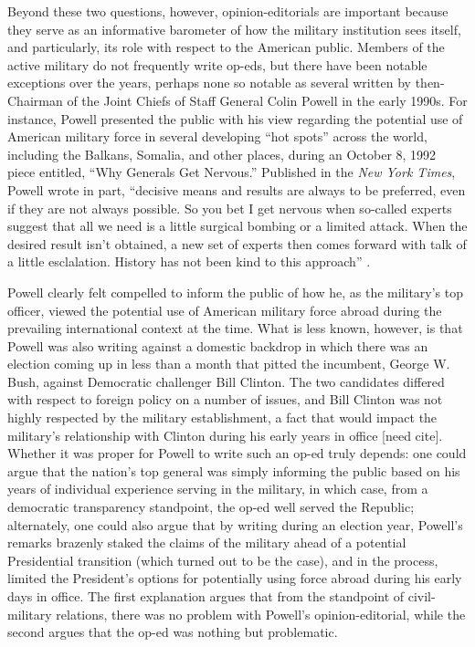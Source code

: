 \documentclass[12pt,]{article}
\begin{document}
Beyond these two questions, however, opinion-editorials are important because they serve as an informative barometer of how the military institution sees itself, and particularly, its role with respect to the American public. Members of the active military do not frequently write op-eds, but there have been notable exceptions over the years, perhaps none so notable as several written by then-Chairman of the Joint Chiefs of Staff General Colin Powell in the early 1990s. For instance, Powell presented the public with his view regarding the potential use of American military force in several developing ``hot spots'' across the world, including the Balkans, Somalia, and other places, during an October 8, 1992 piece entitled, ``Why Generals Get Nervous.'' Published in the \emph{New York Times}, Powell wrote in part, ``decisive means and results are always to be preferred, even if they are not always possible. So you bet I get nervous when so-called experts suggest that all we need is a little surgical bombing or a limited attack. When the desired result isn't obtained, a new set of experts then comes forward with talk of a little esclalation. History has not been kind to this approach'' \autocite{powell_opinion_1992}.

Powell clearly felt compelled to inform the public of how he, as the military's top officer, viewed the potential use of American military force abroad during the prevailing international context at the time. What is less known, however, is that Powell was also writing against a domestic backdrop in which there was an election coming up in less than a month that pitted the incumbent, George W. Bush, against Democratic challenger Bill Clinton. The two candidates differed with respect to foreign policy on a number of issues, and Bill Clinton was not highly respected by the military establishment, a fact that would impact the military's relationship with Clinton during his early years in office {[}need cite{]}. Whether it was proper for Powell to write such an op-ed truly depends: one could argue that the nation's top general was simply informing the public based on his years of individual experience serving in the military, in which case, from a democratic transparency standpoint, the op-ed well served the Republic; alternately, one could also argue that by writing during an election year, Powell's remarks brazenly staked the claims of the military ahead of a potential Presidential transition (which turned out to be the case), and in the process, limited the President's options for potentially using force abroad during his early days in office. The first explanation argues that from the standpoint of civil-military relations, there was no problem with Powell's opinion-editorial, while the second argues that the op-ed was nothing but problematic.
\end{document}
